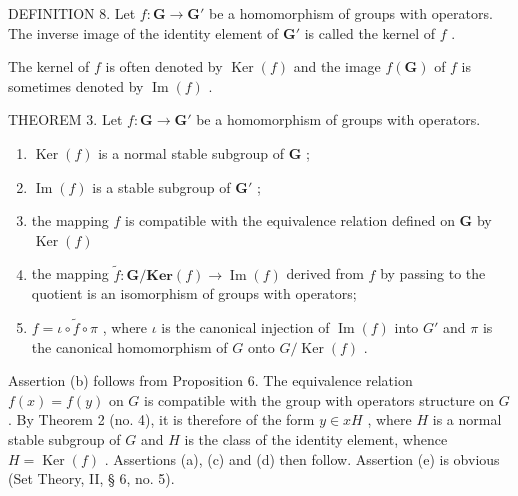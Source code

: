 DEFINITION 8. Let \(f: \mathbf{G} \to \mathbf{G}'\) be a homomorphism of groups with operators. The inverse image of the identity element of \(\mathbf{G}'\) is called the kernel of \(f\) .

The kernel of \(f\) is often denoted by \(\operatorname{Ker}(f)\) and the image \(f(\mathbf{G})\) of \(f\) is sometimes denoted by \(\operatorname{Im}(f)\) .

THEOREM 3. Let \(f: \mathbf{G} \to \mathbf{G}'\) be a homomorphism of groups with operators.

\begin{enumerate}
\def\labelenumi{(\alph{enumi})}
\item
  \(\operatorname{Ker}(f)\) is a normal stable subgroup of \(\mathbf{G}\) ;
\item
  \(\operatorname{Im}(f)\) is a stable subgroup of \(\mathbf{G}'\) ;
\item
  the mapping \(f\) is compatible with the equivalence relation defined on \(\mathbf{G}\) by \(\operatorname{Ker}(f)\)
\item
  the mapping \(\tilde{f}\colon \mathbf{G} / \mathbf{Ker}(f)\to \operatorname {Im}(f)\) derived from \(f\) by passing to the quotient is an isomorphism of groups with operators;
\item
  \(f = \iota \circ \tilde{f} \circ \pi\) , where \(\iota\) is the canonical injection of \(\operatorname{Im}(f)\) into \(G'\) and \(\pi\) is the canonical homomorphism of \(G\) onto \(G / \operatorname{Ker}(f)\) .
\end{enumerate}

Assertion (b) follows from Proposition 6. The equivalence relation \(f(x) = f(y)\) on \(G\) is compatible with the group with operators structure on \(G\) . By Theorem 2 (no. 4), it is therefore of the form \(y \in xH\) , where \(H\) is a normal stable subgroup of \(G\) and \(H\) is the class of the identity element, whence \(H = \operatorname{Ker}(f)\) . Assertions (a), (c) and (d) then follow. Assertion (e) is obvious (Set Theory, II, § 6, no. 5).


